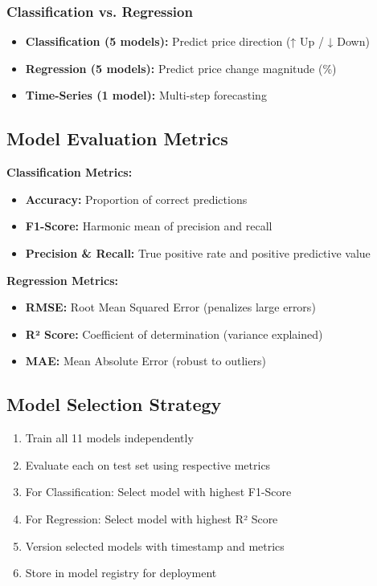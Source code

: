 \subsubsection{Classification vs. Regression}
\begin{itemize}
    \item \textbf{Classification (5 models):} Predict price direction (↑ Up / ↓ Down)
    \item \textbf{Regression (5 models):} Predict price change magnitude (\%)
    \item \textbf{Time-Series (1 model):} Multi-step forecasting
\end{itemize}

\subsection{Model Evaluation Metrics}

\textbf{Classification Metrics:}
\begin{itemize}
    \item \textbf{Accuracy:} Proportion of correct predictions
    \item \textbf{F1-Score:} Harmonic mean of precision and recall
    \item \textbf{Precision \& Recall:} True positive rate and positive predictive value
\end{itemize}

\textbf{Regression Metrics:}
\begin{itemize}
    \item \textbf{RMSE:} Root Mean Squared Error (penalizes large errors)
    \item \textbf{R² Score:} Coefficient of determination (variance explained)
    \item \textbf{MAE:} Mean Absolute Error (robust to outliers)
\end{itemize}

\subsection{Model Selection Strategy}

\begin{enumerate}
    \item Train all 11 models independently
    \item Evaluate each on test set using respective metrics
    \item For Classification: Select model with highest F1-Score
    \item For Regression: Select model with highest R² Score
    \item Version selected models with timestamp and metrics
    \item Store in model registry for deployment
\end{enumerate}

